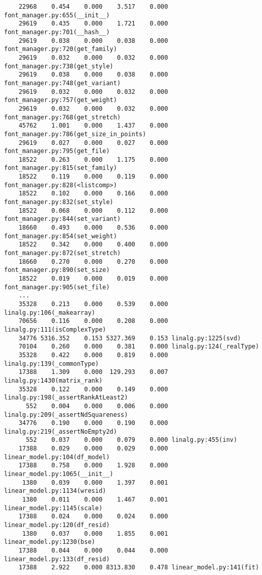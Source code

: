 \documentclass{article}
\begin{document}
\begin{verbatim}
    22968    0.454    0.000    3.517    0.000 font_manager.py:655(__init__)
    29619    0.435    0.000    1.721    0.000 font_manager.py:701(__hash__)
    29619    0.038    0.000    0.038    0.000 font_manager.py:720(get_family)
    29619    0.032    0.000    0.032    0.000 font_manager.py:738(get_style)
    29619    0.038    0.000    0.038    0.000 font_manager.py:748(get_variant)
    29619    0.032    0.000    0.032    0.000 font_manager.py:757(get_weight)
    29619    0.032    0.000    0.032    0.000 font_manager.py:768(get_stretch)
    45762    1.001    0.000    1.437    0.000 font_manager.py:786(get_size_in_points)
    29619    0.027    0.000    0.027    0.000 font_manager.py:795(get_file)
    18522    0.263    0.000    1.175    0.000 font_manager.py:815(set_family)
    18522    0.119    0.000    0.119    0.000 font_manager.py:828(<listcomp>)
    18522    0.102    0.000    0.166    0.000 font_manager.py:832(set_style)
    18522    0.068    0.000    0.112    0.000 font_manager.py:844(set_variant)
    18660    0.493    0.000    0.536    0.000 font_manager.py:854(set_weight)
    18522    0.342    0.000    0.400    0.000 font_manager.py:872(set_stretch)
    18660    0.270    0.000    0.270    0.000 font_manager.py:890(set_size)
    18522    0.019    0.000    0.019    0.000 font_manager.py:905(set_file)
    ...
    35328    0.213    0.000    0.539    0.000 linalg.py:106(_makearray)
    70656    0.116    0.000    0.208    0.000 linalg.py:111(isComplexType)
    34776 5316.352    0.153 5327.369    0.153 linalg.py:1225(svd)
    70104    0.260    0.000    0.381    0.000 linalg.py:124(_realType)
    35328    0.422    0.000    0.819    0.000 linalg.py:139(_commonType)
    17388    1.309    0.000  129.293    0.007 linalg.py:1430(matrix_rank)
    35328    0.122    0.000    0.149    0.000 linalg.py:198(_assertRankAtLeast2)
      552    0.004    0.000    0.006    0.000 linalg.py:209(_assertNdSquareness)
    34776    0.190    0.000    0.190    0.000 linalg.py:219(_assertNoEmpty2d)
      552    0.037    0.000    0.079    0.000 linalg.py:455(inv)
    17388    0.029    0.000    0.029    0.000 linear_model.py:104(df_model)
    17388    0.758    0.000    1.928    0.000 linear_model.py:1065(__init__)
     1380    0.039    0.000    1.397    0.001 linear_model.py:1134(wresid)
     1380    0.011    0.000    1.467    0.001 linear_model.py:1145(scale)
    17388    0.024    0.000    0.024    0.000 linear_model.py:120(df_resid)
     1380    0.037    0.000    1.855    0.001 linear_model.py:1230(bse)
    17388    0.044    0.000    0.044    0.000 linear_model.py:133(df_resid)
    17388    2.922    0.000 8313.830    0.478 linear_model.py:141(fit)

\end{verbatim}
\end{document}
